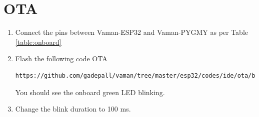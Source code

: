 \section{OTA}
\renewcommand{\theequation}{\theenumi}
\renewcommand{\thefigure}{\theenumi}
\begin{enumerate}[label=\thesection.\arabic*.,ref=\thesection.\theenumi]
\item Connect the pins between Vaman-ESP32 and Vaman-PYGMY as per Table \ref{table:onboard}
\begin{table}[h]
\centering

\caption{}
\label{table:onboard}
\end{table}
\item Flash the following code OTA
\begin{lstlisting}
https://github.com/gadepall/vaman/tree/master/esp32/codes/ide/ota/blinkt
\end{lstlisting}
You should see the onboard green LED blinking.
\item Change the blink duration to 100 ms.
\end{enumerate}



